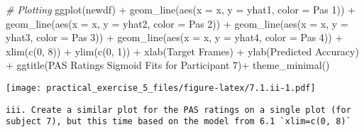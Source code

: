 \documentclass[
]{article}
\newenvironment{Shaded}{\begin{snugshade}}{\end{snugshade}}
\newcommand{\AttributeTok}[1]{\textcolor[rgb]{0.77,0.63,0.00}{#1}}
\newcommand{\CommentTok}[1]{\textcolor[rgb]{0.56,0.35,0.01}{\textit{#1}}}
\newcommand{\DecValTok}[1]{\textcolor[rgb]{0.00,0.00,0.81}{#1}}
\newcommand{\FunctionTok}[1]{\textcolor[rgb]{0.00,0.00,0.00}{#1}}
\newcommand{\NormalTok}[1]{#1}
\newcommand{\SpecialCharTok}[1]{\textcolor[rgb]{0.00,0.00,0.00}{#1}}
\newcommand{\StringTok}[1]{\textcolor[rgb]{0.31,0.60,0.02}{#1}}
\begin{document}
\begin{Shaded}
\begin{Highlighting}[]
\CommentTok{\# Plotting}
\FunctionTok{ggplot}\NormalTok{(newdf) }\SpecialCharTok{+} 
  \FunctionTok{geom\_line}\NormalTok{(}\FunctionTok{aes}\NormalTok{(}\AttributeTok{x =}\NormalTok{ x, }\AttributeTok{y =}\NormalTok{ yhat1, }\AttributeTok{color =} \StringTok{\textquotesingle{}Pas 1\textquotesingle{}}\NormalTok{)) }\SpecialCharTok{+} 
  \FunctionTok{geom\_line}\NormalTok{(}\FunctionTok{aes}\NormalTok{(}\AttributeTok{x =}\NormalTok{ x, }\AttributeTok{y =}\NormalTok{ yhat2, }\AttributeTok{color =} \StringTok{\textquotesingle{}Pas 2\textquotesingle{}}\NormalTok{)) }\SpecialCharTok{+} 
  \FunctionTok{geom\_line}\NormalTok{(}\FunctionTok{aes}\NormalTok{(}\AttributeTok{x =}\NormalTok{ x, }\AttributeTok{y =}\NormalTok{ yhat3, }\AttributeTok{color =} \StringTok{\textquotesingle{}Pas 3\textquotesingle{}}\NormalTok{)) }\SpecialCharTok{+} 
  \FunctionTok{geom\_line}\NormalTok{(}\FunctionTok{aes}\NormalTok{(}\AttributeTok{x =}\NormalTok{ x, }\AttributeTok{y =}\NormalTok{ yhat4, }\AttributeTok{color =} \StringTok{\textquotesingle{}Pas 4\textquotesingle{}}\NormalTok{)) }\SpecialCharTok{+} 
  \FunctionTok{xlim}\NormalTok{(}\FunctionTok{c}\NormalTok{(}\DecValTok{0}\NormalTok{, }\DecValTok{8}\NormalTok{)) }\SpecialCharTok{+}
  \FunctionTok{ylim}\NormalTok{(}\FunctionTok{c}\NormalTok{(}\DecValTok{0}\NormalTok{, }\DecValTok{1}\NormalTok{)) }\SpecialCharTok{+} 
  \FunctionTok{xlab}\NormalTok{(}\StringTok{\textquotesingle{}Target Frames\textquotesingle{}}\NormalTok{) }\SpecialCharTok{+} 
  \FunctionTok{ylab}\NormalTok{(}\StringTok{\textquotesingle{}Predicted Accuracy\textquotesingle{}}\NormalTok{) }\SpecialCharTok{+}
  \FunctionTok{ggtitle}\NormalTok{(}\StringTok{\textquotesingle{}PAS Ratings Sigmoid Fits for Participant 7\textquotesingle{}}\NormalTok{)}\SpecialCharTok{+}
  \FunctionTok{theme\_minimal}\NormalTok{()}
\end{Highlighting}
\end{Shaded}

\texttt{[image: practical\_exercise\_5\_files/figure-latex/7.1.ii-1.pdf]}

\begin{verbatim}
iii. Create a similar plot for the PAS ratings on a single plot (for subject 7), but this time based on the model from 6.1 `xlim=c(0, 8)` 
\end{verbatim}
\end{document}
